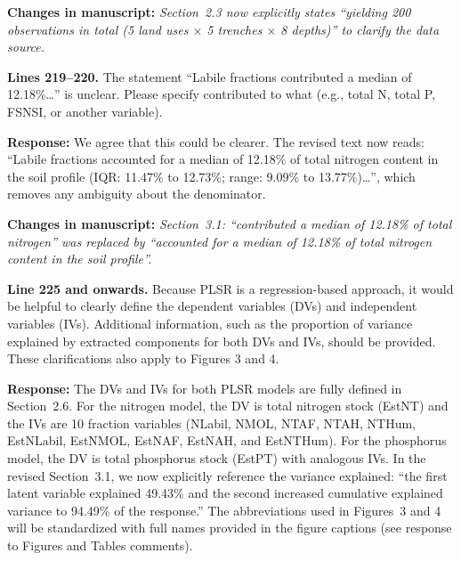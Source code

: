 \documentclass[11pt,a4paper]{article}
\newcommand{\response}[1]{\par\noindent\textcolor{responsecolor}{\textbf{Response:}} #1}
\newcommand{\change}[1]{\par\noindent\textcolor{changecolor}{\textbf{Changes in manuscript:}} \textit{#1}}
\begin{document}
\change{Section~2.3 now explicitly states ``yielding 200 observations in total (5 land uses $\times$ 5 trenches $\times$ 8 depths)'' to clarify the data source.}

\bigskip


\begin{reviewerbox}
\textbf{Lines 219--220.} The statement ``Labile fractions contributed a median of 12.18\%\ldots'' is unclear. Please specify contributed to what (e.g., total N, total P, FSNSI, or another variable).
\end{reviewerbox}

\response{We agree that this could be clearer. The revised text now reads: ``Labile fractions accounted for a median of 12.18\% of total nitrogen content in the soil profile (IQR: 11.47\% to 12.73\%; range: 9.09\% to 13.77\%)\ldots'', which removes any ambiguity about the denominator.}

\change{Section~3.1: ``contributed a median of 12.18\% of total nitrogen'' was replaced by ``accounted for a median of 12.18\% of total nitrogen content in the soil profile''.}

\bigskip


\begin{reviewerbox}
\textbf{Line 225 and onwards.} Because PLSR is a regression-based approach, it would be helpful to clearly define the dependent variables (DVs) and independent variables (IVs). Additional information, such as the proportion of variance explained by extracted components for both DVs and IVs, should be provided. These clarifications also apply to Figures 3 and 4.
\end{reviewerbox}

\response{The DVs and IVs for both PLSR models are fully defined in Section~2.6. For the nitrogen model, the DV is total nitrogen stock (EstNT) and the IVs are 10 fraction variables (NLabil, NMOL, NTAF, NTAH, NTHum, EstNLabil, EstNMOL, EstNAF, EstNAH, and EstNTHum). For the phosphorus model, the DV is total phosphorus stock (EstPT) with analogous IVs. In the revised Section~3.1, we now explicitly reference the variance explained: ``the first latent variable explained 49.43\% and the second increased cumulative explained variance to 94.49\% of the response.'' The abbreviations used in Figures~3 and 4 will be standardized with full names provided in the figure captions (see response to Figures and Tables comments).}
\end{document}
